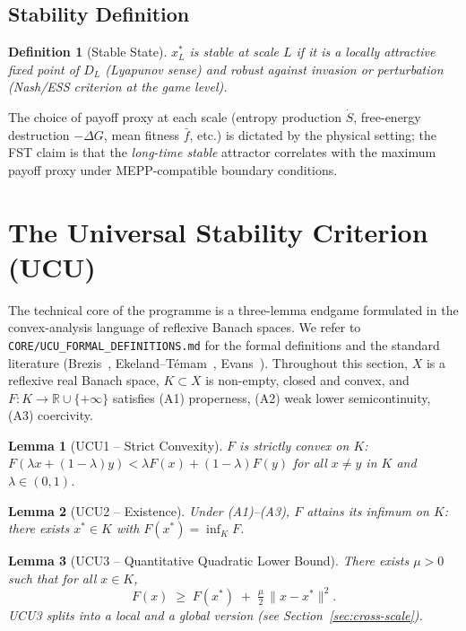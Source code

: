 \documentclass[11pt,a4paper]{article}
\newtheorem{definition}{Definition}
\newtheorem{lemma}{Lemma}
\theoremstyle{remark}
\begin{document}
\subsection{Stability Definition}

\begin{definition}[Stable State]
$x_L^*$ is \emph{stable} at scale $L$ if it is a locally attractive
fixed point of $D_L$ (Lyapunov sense) and robust against invasion
or perturbation (Nash/ESS criterion at the game level).
\end{definition}

The choice of payoff proxy at each scale (entropy production
$\dot S$, free-energy destruction $-\Delta G$, mean fitness $\bar f$,
etc.) is dictated by the physical setting; the FST claim is that the
\emph{long-time stable} attractor correlates with the maximum payoff
proxy under MEPP-compatible boundary conditions.

\section{The Universal Stability Criterion (UCU)}
\label{sec:ucu}

The technical core of the programme is a three-lemma endgame
formulated in the convex-analysis language of reflexive Banach spaces.
We refer to \texttt{CORE/UCU\_FORMAL\_DEFINITIONS.md}
for the formal definitions and the standard literature
(Brezis~\cite{Brezis2011}, Ekeland--T\'emam~\cite{EkelandTemam1999},
Evans~\cite{Evans2010}). Throughout this section, $X$ is a reflexive
real Banach space, $K \subset X$ is non-empty, closed and convex, and
$F : K \to \mathbb{R} \cup \{+\infty\}$ satisfies (A1) properness,
(A2) weak lower semicontinuity, (A3) coercivity.

\begin{lemma}[UCU1 -- Strict Convexity]
\label{lem:ucu1}
$F$ is \emph{strictly convex} on $K$:
$F(\lambda x + (1{-}\lambda) y) < \lambda F(x) + (1{-}\lambda)F(y)$
for all $x \neq y$ in $K$ and $\lambda \in (0,1)$.
\end{lemma}

\begin{lemma}[UCU2 -- Existence]
\label{lem:ucu2}
Under (A1)--(A3), $F$ attains its infimum on $K$:
there exists $x^* \in K$ with $F(x^*) = \inf_K F$.
\end{lemma}

\begin{lemma}[UCU3 -- Quantitative Quadratic Lower Bound]
\label{lem:ucu3}
There exists $\mu > 0$ such that for all $x \in K$,
\[
F(x) \;\ge\; F(x^*) \;+\; \tfrac{\mu}{2}\,\|x - x^*\|^2.
\]
UCU3 splits into a \emph{local} and a \emph{global} version
(see Section~\ref{sec:cross-scale}).
\end{lemma}
\end{document}
